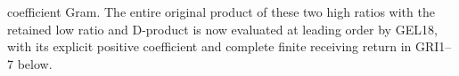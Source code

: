 coefficient Gram. The entire original product of these two
high ratios with the retained low ratio and D-product is now
evaluated at leading order by GEL18, with its explicit positive
coefficient and complete finite receiving return in GRI1--7 below.